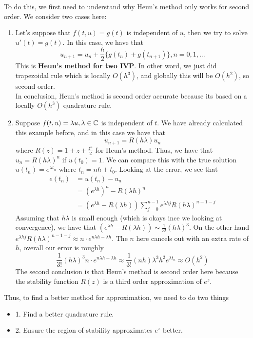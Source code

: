 \documentclass{article}
\begin{document}
To do this, we first need to understand why Heun's method only works for second order. We consider two cases here:
\begin{enumerate}
    \item Let's suppose that $f(t, u) = g(t)$ is independent of $u$, then we try to solve $u'(t) = g(t)$. In this case, we have that
    \[u_{n+1} = u_n + \frac{h}{2} \{g(t_n) + g(t_{n+1})\}, n = 0, 1, ... \]
    This is \textbf{Heun's method for two IVP}. In other word, we just did trapezoidal rule which is locally $O(h^3)$, and globally this will be $O(h^2)$, so second order.\\

    In conclusion, Heun's method is second order accurate because its based on a locally $O(h^3)$ quadrature rule.
    \item Suppose $f(t, u) = \lambda u, \lambda \in \mathbb{C}$ is independent of $t$. We have already calculated this example before, and in this case we have that
    \[u_{n+1} = R(h \lambda) u_n\]
    where $R(z) = 1 + z + \frac{z^2}{2}$ for Heun's method. Thus, we have that $u_n = R (h \lambda)^n$ if $u(t_0) = 1$. We can compare this with the true solution $u(t_n) = e^{\lambda t_n}$ where $t_n = nh + t_0$. Looking at the error, we see that
    \begin{align*}
        e(t_n) &= u(t_n) - u_n\\
        &= (e^{\lambda h})^n - R(\lambda h)^n\\
        &= (e^{\lambda h} - R(\lambda h)) \sum_{j = 0}^{n-1} e^{\lambda h j} R(h \lambda)^{n - 1 - j}
    \end{align*}
    Assuming that $h\lambda$ is small enough (which is okays ince we looking at convergence), we have that $(e^{\lambda h} - R(\lambda h)) \sim \frac{1}{3!} (h\lambda)^3$. On the other hand $ e^{\lambda h j} R(h \lambda)^{n - 1 - j} \approx n \cdot e^{n \lambda h - \lambda h}$. The $n$ here cancels out with an extra rate of $h$, overall our error is roughly
    \[\frac{1}{3!} (h\lambda)^3 n \cdot e^{n \lambda h - \lambda h} \approx \frac{1}{3!} (nh) \lambda^3 h^2 e^{\lambda t_n} \approx O(h^2)\]
    The second conclusion is that Heun's method is second order here because the stability function $R(z)$ is a third order approximation of $e^z$.
\end{enumerate}

Thus, to find a better method for approximation, we need to do two things
\begin{itemize}
    \item 1. Find a better quadrature rule.
    \item 2. Ensure the region of stability approximates $e^z$ better.
\end{itemize}
\end{document}
